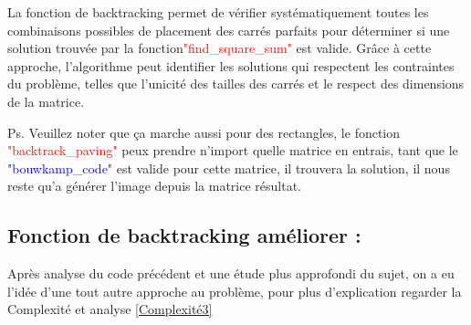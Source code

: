\documentclass{article}
\begin{document}
La fonction de backtracking permet de vérifier systématiquement toutes les combinaisons possibles de placement des carrés parfaits pour déterminer si une solution trouvée par la fonction\textcolor{red}{"find\_square\_sum"}  est valide. Grâce à cette approche, l'algorithme peut identifier les solutions qui respectent les contraintes du problème, telles que l'unicité des tailles des carrés et le respect des dimensions de la matrice.\newline

Ps. Veuillez noter que ça marche aussi pour des rectangles, le fonction \textcolor{red}{"backtrack\_paving"} peux prendre n'import quelle matrice en entrais, tant que le \textcolor{blue}{"bouwkamp\_code"} est valide pour cette matrice, il trouvera la solution, il nous reste qu'a générer l'image depuis la matrice résultat.


\subsection{Fonction de backtracking améliorer :}

Après analyse du code précédent et une étude plus approfondi du sujet, on a eu l'idée d'une tout autre approche au problème, pour plus d'explication regarder la Complexité et analyse  \ref{Complexité3}
\end{document}

